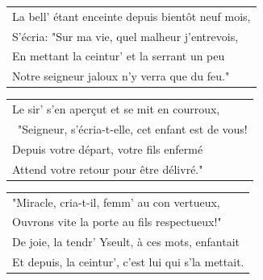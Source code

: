 \documentclass{article}
\begin{document}
\begin{flushleft}
\begin{tabularx}{0.8\textwidth} {
    >{\raggedright\arraybackslash}X}
La bell’ étant enceinte depuis bientôt neuf mois,\\
S’écria: "Sur ma vie, quel malheur j’entrevois,\\
En mettant la ceintur’ et la serrant un peu\\
Notre seigneur jaloux n’y verra que du feu."\\
\end{tabularx}
\end{flushleft}
\begin{flushleft}
\begin{tabularx}{0.8\textwidth} {
    >{\raggedright\arraybackslash}X}
Le sir’ s’en aperçut et se mit en courroux,\\\
"Seigneur, s’écria-t-elle, cet enfant est de vous!\\
Depuis votre départ, votre fils enfermé\\
Attend votre retour pour être délivré."\\
\end{tabularx}
\end{flushleft}
\begin{flushleft}
\begin{tabularx}{0.8\textwidth} {
    >{\raggedright\arraybackslash}X}
"Miracle, cria-t-il, femm’ au con vertueux,\\
Ouvrons vite la porte au fils respectueux!"\\
De joie, la tendr’ Yseult, à ces mots, enfantait\\
Et depuis, la ceintur’, c’est lui qui s’la mettait.\\
\end{tabularx}
\end{flushleft}
\end{document}
